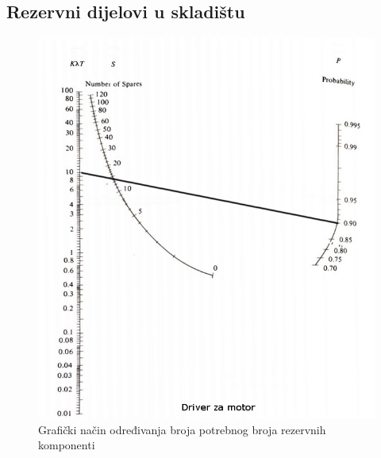 \documentclass[12pt]{article}
\begin{document}
\subsection{Rezervni dijelovi u skladištu}
\begin{figure}[!h]
\includegraphics[scale=0.6]{driver_za_motore.png}
\caption{Grafički način određivanja broja potrebnog broja rezervnih komponenti}
\end{figure}
\end{document}
